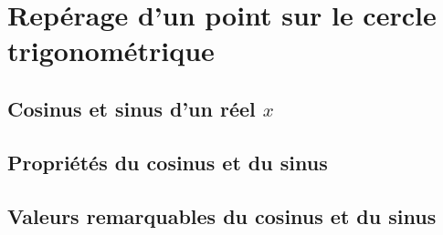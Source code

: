 \documentclass[10pt]{beamer}
\theoremstyle{definition}
\theoremstyle{example}
\begin{document}
\begin{frame}

\end{frame}

\section{Repérage d'un point sur le cercle trigonométrique}
\subsection{Cosinus et sinus d'un réel $x$}

\begin{frame}

\end{frame}

\subsection{Propriétés du cosinus et du sinus}

\begin{frame}

\end{frame}

\subsection{Valeurs remarquables du cosinus et du sinus}

\begin{frame}

\end{frame}
\end{document}

